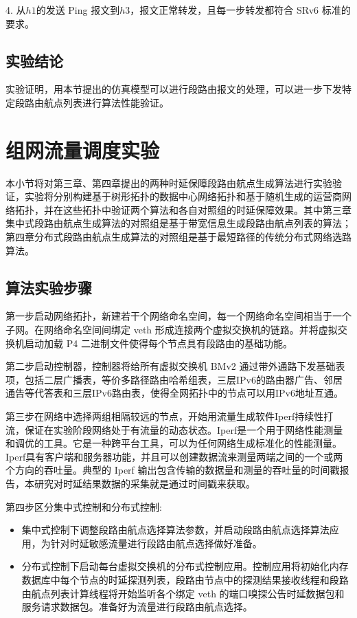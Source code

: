 4. 从$h1$的发送 \gls*{Ping} 报文到$h3$，报文正常转发，且每一步转发都符合 \gls*{SRv6} \cite{} 标准的要求。

\subsection{实验结论}

实验证明，用本节提出的仿真模型可以进行段路由报文的处理，可以进一步下发特定段路由航点列表进行算法性能验证。

\section{组网流量调度实验}

本小节将对第三章、第四章提出的两种时延保障段路由航点生成算法进行实验验证，实验将分别构建基于树形拓扑的数据中心网络拓扑和基于随机生成的运营商网络拓扑，并在这些拓扑中验证两个算法和各自对照组的时延保障效果。其中第三章集中式段路由航点生成算法的对照组是基于带宽信息生成段路由航点列表的算法；第四章分布式段路由航点生成算法的对照组是基于最短路径的传统分布式网络选路算法。

\subsection{算法实验步骤}

第一步启动网络拓扑，新建若干个网络命名空间，每一个网络命名空间相当于一个子网。在网络命名空间间绑定 \gls*{veth} 形成连接两个虚拟交换机的链路。并将虚拟交换机启动加载 \gls*{P4} 二进制文件使得每个节点具有段路由的基础功能。

第二步启动控制器，控制器将给所有虚拟交换机 \gls*{BMv2} 通过带外通路下发基础表项，包括二层广播表，等价多路径路由哈希组表，三层IPv6的路由器广告、邻居通告等代答表和三层IPv6路由表，使得全网拓扑中的节点可以用IPv6地址互通。

第三步在网络中选择两组相隔较远的节点，开始用流量生成软件Iperf持续性打流，保证在实验阶段网络处于有流量的动态状态。Iperf是一个用于网络性能测量和调优的工具。它是一种跨平台工具，可以为任何网络生成标准化的性能测量。Iperf具有客户端和服务器功能，并且可以创建数据流来测量两端之间的一个或两个方向的吞吐量。典型的 Iperf 输出包含传输的数据量和测量的吞吐量的时间戳报告，本研究对时延结果数据的采集就是通过时间戳来获取。

第四步区分集中式控制和分布式控制:

\begin{itemize}
\item 集中式控制下调整段路由航点选择算法参数，并启动段路由航点选择算法应用，为针对时延敏感流量进行段路由航点选择做好准备。
\item 分布式控制下启动每台虚拟交换机的分布式控制应用。控制应用将初始化内存数据库中每个节点的时延探测列表，段路由节点中的探测结果接收线程和段路由航点列表计算线程将开始监听各个绑定 \gls*{veth} 的端口嗅探公告时延数据包和服务请求数据包。准备好为流量进行段路由航点选择。
\end{itemize}

